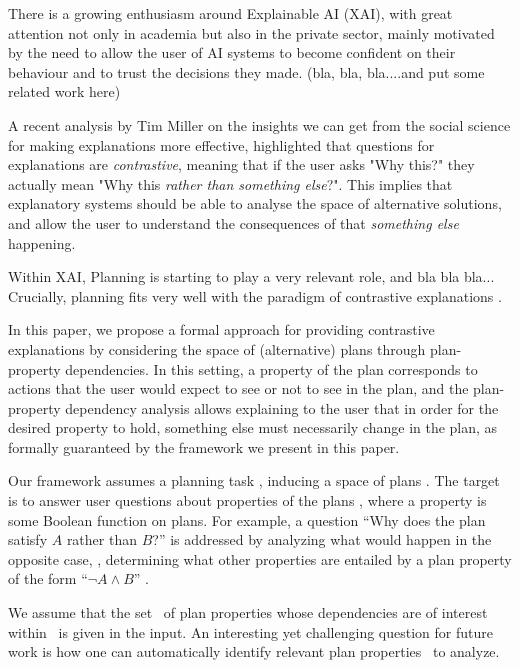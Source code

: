 There is a growing enthusiasm around Explainable AI (XAI), with great attention not only in academia but also in the private sector, mainly motivated by the need to allow the user of AI systems to become confident on their behaviour and to trust the decisions they made. (bla, bla, bla....and put some related work here)

A recent analysis by Tim Miller on the insights we can get from the social science for making explanations more effective, highlighted that questions for explanations are \textit{contrastive}, meaning that if the user asks "Why this?" they actually mean "Why this \textit{rather than something else}?".
 This implies that explanatory systems should be able to analyse the space of alternative solutions, and allow the user to understand the consequences of that \textit{something else} happening.

Within XAI, Planning is starting to play a very relevant role, and bla bla bla...
Crucially, planning fits very well with the paradigm of contrastive explanations \cite{xaip_magazzeni, contrastive_miller}.

In this paper, we propose a formal approach for providing contrastive explanations by considering the space of (alternative) plans through plan-property dependencies. In this setting, a property of the plan corresponds to actions that the user would expect to see or not to see in the plan, and the plan-property dependency analysis allows explaining to the user that in order for the desired property to hold, something else must necessarily change in the plan, as formally guaranteed by the framework we present in this paper.

Our framework assumes a planning task \task, inducing a space of plans
\plans. The target is to answer user questions about properties of the
plans \plans, where a property is some Boolean function on plans. For
example, a question ``Why does the plan satisfy $A$ rather than $B$?''
is addressed by analyzing what would happen in the opposite case, \ie,
determining what other properties are entailed by a plan property of
the form ``$\neg A \wedge B$'' . 

%



We assume that the set \props\ of plan properties whose dependencies
are of interest within \plans\ is given in the input. An interesting
yet challenging question for future work is how one can automatically
identify relevant plan properties \props\ to analyze.


